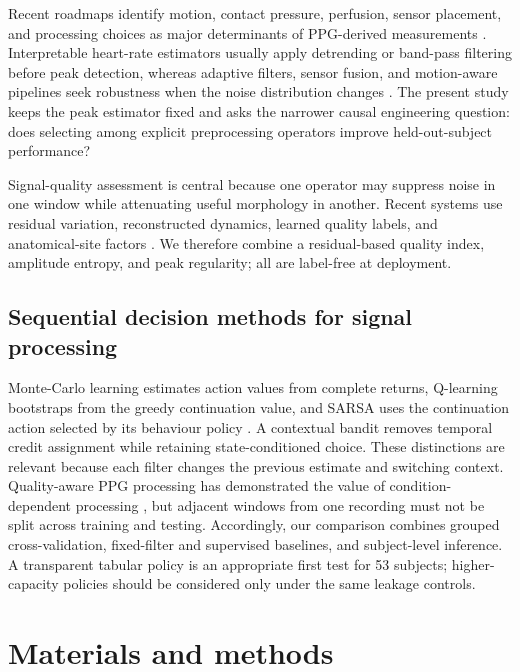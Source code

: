 \documentclass{elektr}
\begin{document}
Recent roadmaps identify motion, contact pressure, perfusion, sensor placement,
and processing choices as major determinants of PPG-derived measurements
\cite{charlton2023,kyriacou2026}. Interpretable heart-rate estimators usually apply
detrending or band-pass filtering before peak detection, whereas adaptive
filters, sensor fusion, and motion-aware pipelines seek robustness when the
noise distribution changes \cite{wearablefusion2023,wrist2023,hao2024,sicbaldi2025}.
The present study keeps the peak estimator fixed and asks the narrower causal
engineering question: does selecting among explicit preprocessing operators
improve held-out-subject performance?

Signal-quality assessment is central because one operator may suppress noise in
one window while attenuating useful morphology in another. Recent systems use
residual variation, reconstructed dynamics, learned quality labels, and
anatomical-site factors \cite{naeini2023,schmith2023,sarkar2024,determinants2025}.
We therefore combine a residual-based quality index, amplitude entropy, and
peak regularity; all are label-free at deployment.

\subsection{Sequential decision methods for signal processing}

Monte-Carlo learning estimates action values from complete returns, Q-learning
bootstraps from the greedy continuation value, and SARSA uses the continuation
action selected by its behaviour policy \cite{sutton2018}. A contextual bandit
removes temporal credit assignment while retaining state-conditioned choice.
These distinctions are relevant because each filter changes the previous
estimate and switching context. Quality-aware PPG processing has demonstrated
the value of condition-dependent processing \cite{beh2024,guo2026}, but adjacent
windows from one recording must not be split across training and testing.
Accordingly, our comparison combines grouped cross-validation, fixed-filter and
supervised baselines, and subject-level inference. A transparent tabular policy
is an appropriate first test for 53 subjects; higher-capacity policies should be
considered only under the same leakage controls.

\section{Materials and methods}
\end{document}
